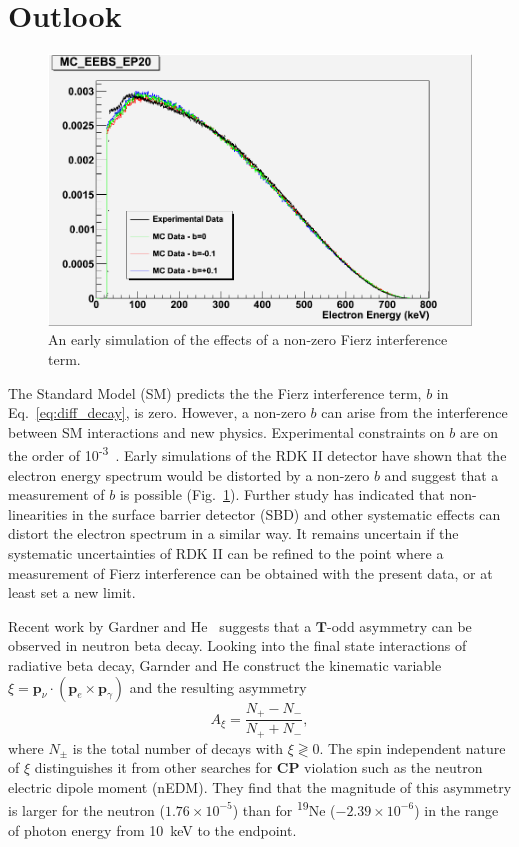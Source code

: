 \documentclass[oneside,12pt]{memoir}
\begin{document}
\section{Outlook}
\label{sec:future}
\begin{figure}[t]
	\includegraphics[width=\textwidth]
		{Electron_KE_Comparison_0_800.png}
	\caption[Early simulation of the effects of a non-zero Fierz interference term.]{An early simulation of the effects of a non-zero Fierz interference term.}
	\label{fig:little_b}
\end{figure}
The Standard Model (SM) predicts the the Fierz interference term, $b$ in Eq.~\ref{eq:diff_decay}, is zero. However, a non-zero $b$ can arise from the interference between SM interactions and new physics. Experimental constraints on $b$ are on the order of 10\textsuperscript{-3}~\cite{Holstein77}. Early simulations of the RDK II detector have shown that the electron energy spectrum would be distorted by a non-zero $b$ and suggest that a measurement of $b$ is possible (Fig.~\ref{fig:little_b}). Further study has indicated that non-linearities in the surface barrier detector (SBD) and other systematic effects can distort the electron spectrum in a similar way. It remains uncertain if the systematic uncertainties of RDK II can be refined to the point where a measurement of Fierz interference can be obtained with the present data, or at least set a new limit.

Recent work by Gardner and He~\cite{gardner12} suggests that a $\mathbf{T}$-odd asymmetry can be observed in neutron beta decay. Looking into the final state interactions of radiative beta decay, Garnder and He construct the kinematic variable $\xi=\mathbf{p}_\nu\cdot(\mathbf{p}_e\times\mathbf{p}_\gamma)$ and the resulting asymmetry
\begin{equation}
	A_\xi=\frac{N_+ - N_-}{N_+ + N_-},
\end{equation}
where $N_{\pm}$ is the total number of decays with $\xi \gtrless 0$. The spin independent nature of $\xi$ distinguishes it from other searches for $\mathbf{CP}$ violation such as the neutron electric dipole moment (nEDM). They find that the magnitude of this asymmetry is larger for the neutron ($1.76\times 10^{-5}$) than for \textsuperscript{19}Ne ($-2.39\times 10^{-6}$) in the range of photon energy from 10~keV to the endpoint.\par
\end{document}
